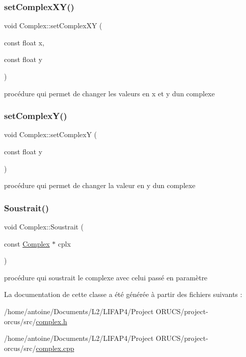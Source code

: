 \subsubsection{\texorpdfstring{set\+Complex\+X\+Y()}{setComplexXY()}}
{\footnotesize\ttfamily void Complex\+::set\+Complex\+XY (\begin{DoxyParamCaption}\item[{const float}]{x,  }\item[{const float}]{y }\end{DoxyParamCaption})}



procédure qui permet de changer les valeurs en x et y d\textquotesingle{}un complexe 

\mbox{\label{classComplex_aae1f9f4c418b86ea62008e7ccc8a03f0}} 
\subsubsection{\texorpdfstring{set\+Complex\+Y()}{setComplexY()}}
{\footnotesize\ttfamily void Complex\+::set\+ComplexY (\begin{DoxyParamCaption}\item[{const float}]{y }\end{DoxyParamCaption})}



procédure qui permet de changer la valeur en y d\textquotesingle{}un complexe 

\mbox{\label{classComplex_aa5227decd635b6042c7a7d4bba253042}} 
\subsubsection{\texorpdfstring{Soustrait()}{Soustrait()}}
{\footnotesize\ttfamily void Complex\+::\+Soustrait (\begin{DoxyParamCaption}\item[{const \hyperlink{classComplex}{Complex} $\ast$}]{cplx }\end{DoxyParamCaption})}



procédure qui soustrait le complexe avec celui passé en paramètre 



La documentation de cette classe a été générée à partir des fichiers suivants \+:\begin{DoxyCompactItemize}
\item 
/home/antoine/\+Documents/\+L2/\+L\+I\+F\+A\+P4/\+Project O\+R\+U\+C\+S/project-\/orcus/src/\hyperlink{complex_8h}{complex.\+h}\item 
/home/antoine/\+Documents/\+L2/\+L\+I\+F\+A\+P4/\+Project O\+R\+U\+C\+S/project-\/orcus/src/\hyperlink{complex_8cpp}{complex.\+cpp}\end{DoxyCompactItemize}
